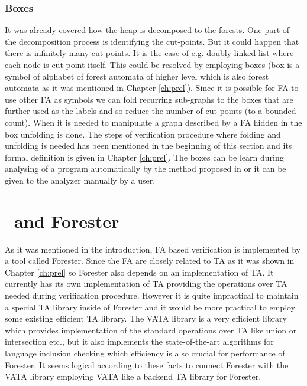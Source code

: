 \subsection{Boxes}
\label{subsec:boxes}

It was already covered how the heap is decomposed to the forests.
One part of the decomposition process is identifying the cut-points.
But it could happen that there is infinitely many cut-points.
It is the case of e.g. doubly linked list where each node is cut-point itself.
This could be resolved by employing boxes (box is a symbol of alphabet of forest automata of higher level which is also forest automata as it was mentioned in Chapter \ref{ch:prel}).
Since it is possible for FA to use other FA as symbols we can fold recurring sub-graphs to the boxes that are further used as the labels
and so reduce the number of cut-points (to a bounded count).
When it is needed to manipulate a graph described by a FA hidden in the box unfolding is done.
The steps of verification procedure where folding and unfolding is needed has been mentioned in the beginning of this section
and its formal definition is given in Chapter \ref{ch:prel}.
The boxes can be learn during analysing of a program automatically by the method proposed in \cite{forester13} or
it can be given to the analyzer manually by a user.

\chapter{\Vata\ and Forester}
\label{ch:tools}

As it was mentioned in the introduction, FA based verification is implemented by a tool
called Forester.
Since the FA are closely related to TA as it was shown in Chapter \ref{ch:prel} so
Forester also depends on an implementation of TA.
It currently has its own implementation of TA providing the operations over TA needed during verification procedure.
However it is quite impractical to maintain a special TA library inside of Forester
and it would be more practical to employ some existing efficient TA library.
The VATA library is a very efficient library which provides implementation of the standard operations over TA like union or intersection etc.,
but it also implements the state-of-the-art algorithms \cite{tacas10} for language inclusion checking which efficiency
is also crucial for performance of Forester.
It seems logical according to these facts to connect Forester with the VATA library employing VATA like a backend TA library for Forester.

